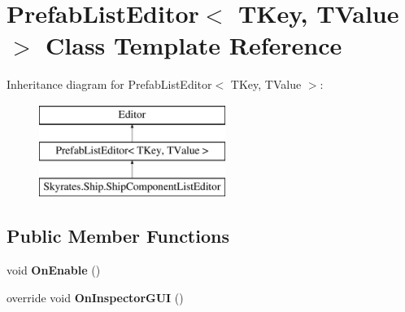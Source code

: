 \hypertarget{class_prefab_list_editor_3_01_t_key_00_01_t_value_01_4}{\section{Prefab\-List\-Editor$<$ T\-Key, T\-Value $>$ Class Template Reference}
\label{class_prefab_list_editor_3_01_t_key_00_01_t_value_01_4}
}
Inheritance diagram for Prefab\-List\-Editor$<$ T\-Key, T\-Value $>$\-:\begin{figure}[H]
\begin{center}
\leavevmode
\includegraphics[height=3.000000cm]{class_prefab_list_editor_3_01_t_key_00_01_t_value_01_4}
\end{center}
\end{figure}
\subsection*{Public Member Functions}
\begin{DoxyCompactItemize}
\item 
\hypertarget{class_prefab_list_editor_3_01_t_key_00_01_t_value_01_4_abce156071bd29873a449ff13e7fcf82a}{void {\bfseries On\-Enable} ()}\label{class_prefab_list_editor_3_01_t_key_00_01_t_value_01_4_abce156071bd29873a449ff13e7fcf82a}

\item 
\hypertarget{class_prefab_list_editor_3_01_t_key_00_01_t_value_01_4_a3233dccb7a1cc44451652e8d268a36c1}{override void {\bfseries On\-Inspector\-G\-U\-I} ()}\label{class_prefab_list_editor_3_01_t_key_00_01_t_value_01_4_a3233dccb7a1cc44451652e8d268a36c1}

\end{DoxyCompactItemize}
